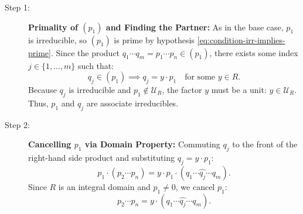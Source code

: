 \begin{proofWrapper}
\begin{content}
\begin{description}
    \item[Step 1:] \textbf{Primality of $(p_1)$ and Finding the Partner:} As in the base case, $p_1$ is irreducible, so $(p_1)$ is prime by hypothesis \eqref{eq:condition-irr-implies-prime}. Since the product $q_1 \cdots q_m = p_1 \cdots p_n \in (p_1)$, there exists some index $j \in \{1, \dots, m\}$ such that:
    \begin{equation}\label{eq:induction-qj-in-p1}
    q_j \in (p_1) \implies q_j = y \cdot p_1 \quad \text{for some } y \in R.
    \end{equation}
    Because $q_j$ is irreducible and $p_1 \notin \mathcal{U}_R$, the factor $y$ must be a unit: $y \in \mathcal{U}_R$. Thus, $p_1$ and $q_j$ are associate irreducibles.
    
    \item[Step 2:] \textbf{Cancelling $p_1$ via Domain Property:} Commuting $q_j$ to the front of the right-hand side product and substituting $q_j = y \cdot p_1$:
    \begin{equation}\label{eq:induction-subst}
    p_1 \cdot (p_2 \cdots p_n) = y \cdot p_1 \cdot (q_1 \cdots \widehat{q_j} \cdots q_m).
    \end{equation}
    Since $R$ is an integral domain and $p_1 \neq 0$, we cancel $p_1$:
    \begin{equation}\label{eq:induction-canceled}
    p_2 \cdots p_n = y \cdot (q_1 \cdots \widehat{q_j} \cdots q_m).
    \end{equation}
    

\end{description}
\end{content}
\end{proofWrapper}
